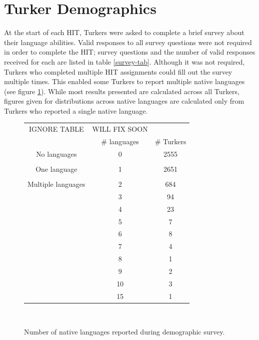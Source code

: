 \documentclass[11pt]{article}
\begin{document}
\section{Turker Demographics}
At the start of each HIT, Turkers were asked to complete a brief survey about their language abilities. Valid responses to all survey questions were not required in order to complete the HIT; survey questions and the number of valid responses received for each are listed in table \ref{survey-tab}. Although it was not required, Turkers who completed multiple HIT assignments could fill out the survey multiple times. This enabled some Turkers to report multiple native languages (see figure \ref{numlangs-tab}). While most results presented are calculated across all Turkers, figures given for distributions across native languages are calculated only from Turkers who reported a single native language.\\

\begin{figure}[h]
\begin{tabular}{ccc}\hline\hline
IGNORE TABLE& WILL FIX SOON&\\
&\# languages&\# Turkers\\
\hline
No languages&0&2555\\\\
One language&1&2651\\\\
Multiple languages&2&684\\
&3&94\\
&4&23\\
&5&7\\
&6&8\\
&7&4\\
&8&1\\
&9&2\\
&10&3\\
&15&1\\
\hline\hline
\end{tabular}
\label{numlangs-tab}\\
\caption{Number of native languages reported during demographic survey.}
\end{figure}
\end{document}
